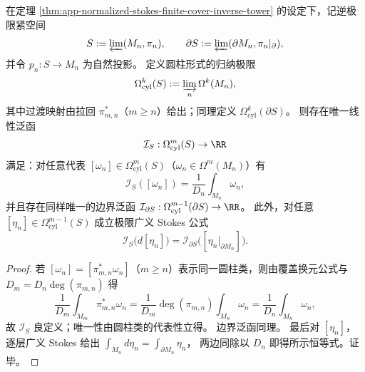 \begin{theorem}\label{thm:app-solenoid-fundamental-current-and-stokes}
在定理 \ref{thm:app-normalized-stokes-finite-cover-inverse-tower} 的设定下，记逆极限紧空间
\[
S:=\varprojlim(M_n,\pi_n),\qquad
\partial S:=\varprojlim(\partial M_n,\pi_n|_{\partial}),
\]
并令 \(p_n:S\to M_n\) 为自然投影。
定义圆柱形式的归纳极限
\[
\Omega^k_{\mathrm{cyl}}(S):=\varinjlim_{n}\Omega^k(M_n),
\]
其中过渡映射由拉回 \(\pi_{m,n}^\ast\)（\(m\ge n\)）给出；同理定义 \(\Omega^{k}_{\mathrm{cyl}}(\partial S)\)。
则存在唯一线性泛函
\[
\mathcal I_S:\Omega^{m}_{\mathrm{cyl}}(S)\to\RR
\]
满足：对任意代表 \([\omega_n]\in\Omega^{m}_{\mathrm{cyl}}(S)\)（\(\omega_n\in\Omega^{m}(M_n)\)）有
\[
\mathcal I_S([\omega_n])=\frac{1}{D_n}\int_{M_n}\omega_n,
\]
并且存在同样唯一的边界泛函 \(\mathcal I_{\partial S}:\Omega^{m-1}_{\mathrm{cyl}}(\partial S)\to\RR\)。
此外，对任意 \([\eta_n]\in\Omega^{m-1}_{\mathrm{cyl}}(S)\) 成立极限广义 Stokes 公式
\[
\mathcal I_S\bigl(d[\eta_n]\bigr)=\mathcal I_{\partial S}\bigl([\eta_n|_{\partial M_n}]\bigr).
\]
\end{theorem}
\begin{proof}
若 \([\omega_n]=[\pi_{m,n}^\ast\omega_n]\)（\(m\ge n\)）表示同一圆柱类，则由覆盖换元公式与 \(D_m=D_n\deg(\pi_{m,n})\) 得
\[
\frac{1}{D_m}\int_{M_m}\pi_{m,n}^\ast\omega_n
=\frac{1}{D_m}\deg(\pi_{m,n})\int_{M_n}\omega_n
=\frac{1}{D_n}\int_{M_n}\omega_n,
\]
故 \(\mathcal I_S\) 良定义；唯一性由圆柱类的代表性立得。
边界泛函同理。
最后对 \([\eta_n]\)，逐层广义 Stokes 给出
\(
\int_{M_n}d\eta_n=\int_{\partial M_n}\eta_n
\)，
两边同除以 \(D_n\) 即得所示恒等式。证毕。
\end{proof}




